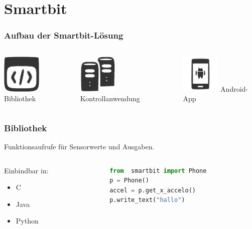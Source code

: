 \documentclass{beamer}
\begin{document}
\section{Smartbit}
\begin{frame}
    \frametitle{Aufbau der Smartbit-Lösung}
    \begin{columns}
        \begin{column}{0.3\textwidth}
            \centering
            \includegraphics[width=5em]{images/lib.pdf}
            Bibliothek
        \end{column}
        \begin{column}{0.3\textwidth}
            \centering
            \includegraphics[width=5em]{images/server.pdf}
            Kontrollanwendung
        \end{column}
        \begin{column}{0.3\textwidth}
            \centering
            \includegraphics[width=5em]{images/android.pdf}
            Android-App
        \end{column}
    \end{columns}
\end{frame}

\begin{frame}[fragile]
    \frametitle{Bibliothek}
    Funktionsaufrufe für Sensorwerte und Ausgaben.
    \begin{columns}
        \begin{column}{0.3\textwidth}
            Einbindbar in:
            \begin{itemize}
                \item C
                \item Java
                \item Python
            \end{itemize}
        \end{column}
        \begin{column}{0.6\textwidth}
            \begin{lstlisting}[language=python]
from  smartbit import Phone
p = Phone()
accel = p.get_x_accelo()
p.write_text("hallo")
            \end{lstlisting}
        \end{column}
    \end{columns}
    
   
\end{frame}
\end{document}
